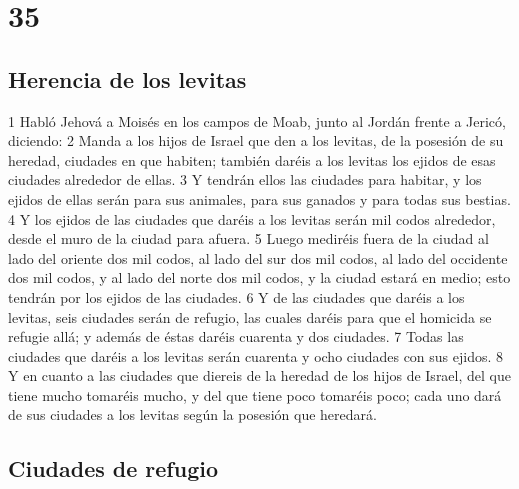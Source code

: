 \chapter{35}

\section*{Herencia de los levitas}

1 Habló Jehová a Moisés en los campos de Moab, junto al Jordán frente a Jericó, diciendo:
2 Manda a los hijos de Israel que den a los levitas, de la posesión de su heredad, ciudades en que habiten; también daréis a los levitas los ejidos de esas ciudades alrededor de ellas.
3 Y tendrán ellos las ciudades para habitar, y los ejidos de ellas serán para sus animales, para sus ganados y para todas sus bestias.
4 Y los ejidos de las ciudades que daréis a los levitas serán mil codos   alrededor, desde el muro de la ciudad para afuera.
5 Luego mediréis fuera de la ciudad al lado del oriente dos mil codos, al lado del sur dos mil codos, al lado del occidente dos mil codos, y al lado del norte dos mil codos, y la ciudad estará en medio; esto tendrán por los ejidos de las ciudades.
6 Y de las ciudades que daréis a los levitas, seis ciudades serán de refugio, las cuales daréis para que el homicida se refugie allá; y además de éstas daréis cuarenta y dos ciudades.
7 Todas las ciudades que daréis a los levitas serán cuarenta y ocho ciudades con sus ejidos.
8 Y en cuanto a las ciudades que diereis de la heredad de los hijos de Israel, del que tiene mucho tomaréis mucho, y del que tiene poco tomaréis poco; cada uno dará de sus ciudades a los levitas según la posesión que heredará.

\section*{Ciudades de refugio}

